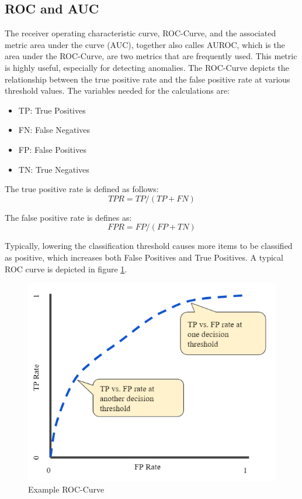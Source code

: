 \subsection{ROC and AUC} \label{AUROC}

The receiver operating characteristic curve, ROC-Curve, and the associated metric area under the curve (AUC), together also calles AUROC, which is the area under the ROC-Curve, are two metrics that are frequently used. This metric is highly useful, especially for detecting anomalies. The ROC-Curve depicts the relationship between the true positive rate and the false positive rate at various threshold values. The variables needed for the calculations are:

\begin{itemize}
	\item TP: True Positives
	\item FN: False Negatives
	\item FP: False Positives
	\item TN: True Negatives	 
\end{itemize}

	
	The true positive rate is defined as follows: \[TPR = TP/(TP+FN)\]
	
	The false positive rate is defines as: \[FPR = FP/(FP+TN)\]

Typically, lowering the classification threshold causes more items to be classified as positive, which increases both False Positives and True Positives. A typical ROC curve is depicted in figure \ref{fig:ROC}.

\begin{figure}[h]
	\centering
	\includegraphics[scale=00.4]{Figures/ROC}
	\decoRule
	\caption[Example ROC-Curve]{Example ROC-Curve \parencite{Google2020}}
	\label{fig:ROC}
\end{figure}

